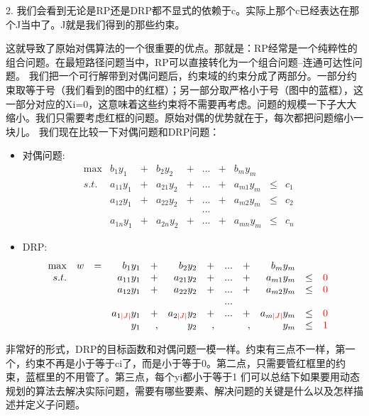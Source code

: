 \documentclass[11pt]{article}
\begin{document}
\begin{CJK}{UTF8}{gbsn}
2. 我们会看到无论是RP还是DRP都不显式的依赖于c。实际上那个c已经表达在那个J当中了。J就是我们得到的那些约束。

这就导致了原始对偶算法的一个很重要的优点。那就是：RP经常是一个纯粹性的组合问题。在最短路径问题当中，RP可以直接转化为一个组合问题--连通可达性问题。
我们把一个可行解带到对偶问题后，约束域的约束分成了两部分。一部分约束取等于号（我们看到的图中的红框）；另一部分取严格小于号（图中的蓝框），这一部分对应的Xi=0，这意味着这些约束将不需要再考虑。问题的规模一下子大大缩小。我们只需要考虑红框的问题。原始对偶的优势就在于，每次都把问题缩小一块儿。
我们现在比较一下对偶问题和DRP问题：
\begin{itemize}
\item 对偶问题:
\[
\begin{array}{rrrrrrrrrrrrl}
\max & b_1y_1    &+&  b_2y_2   &+&  ...&+& b_my_m    &      &    & \\
 s.t. & a_{11}y_1 &+& a_{21}y_2 &+& ... &+& a_{m1}y_m & \leq & c_1 &   \\
      & a_{12}y_1 &+& a_{22}y_2 &+& ... &+& a_{m2}y_m & \leq & c_2 & \\
      &           & &           & & ... & &           &      &     &  \\
      & a_{1n}y_1 &+& a_{2n}y_2 &+& ... &+& a_{mn}y_m & \leq & c_n &
     \end{array} \nonumber
\]
\item DRP:
\[
\begin{array}{rrrrrrrrrrrrrrrrrrrrl}
\max & w &=& b_1y_1    &+&  b_2y_2   &+&  ...&+& b_my_m    &      &    & \\
 s.t. & & & a_{11}y_1 &+& a_{21}y_2 &+& ... &+& a_{m1}y_m & \leq & \textcolor{red}{0} &  \\
      & & & a_{12}y_1 &+& a_{22}y_2 &+& ... &+& a_{m2}y_m & \leq & \textcolor{red}{0} &  \\
      & & &          & &           & & ... & &           &      &     &  \\
      & & & a_{1\textcolor{red}{|J|}}y_1 &+& a_{2\textcolor{red}{|J|}}y_2 &+& ... &+& a_{m\textcolor{red}{|J|}}y_m & \leq & \textcolor{red}{0} & \\
      & & &      y_1 &,&       y_2 &,&     &,&       y_m & \leq & \textcolor{red}{1}   & \\
     \end{array} \nonumber
\]
\end{itemize}
非常好的形式，DRP的目标函数和对偶问题一模一样。约束有三点不一样，第一个，约束不再是小于等于ci了，而是小于等于0。第二点，只需要管红框里的约束，蓝框里的不用管了。第三点，每个yi都小于等于1
们可以总结下如果要用动态规划的算法去解决实际问题，需要有哪些要素、解决问题的关键是什么以及怎样描述并定义子问题。

\end{CJK}
\end{document}
